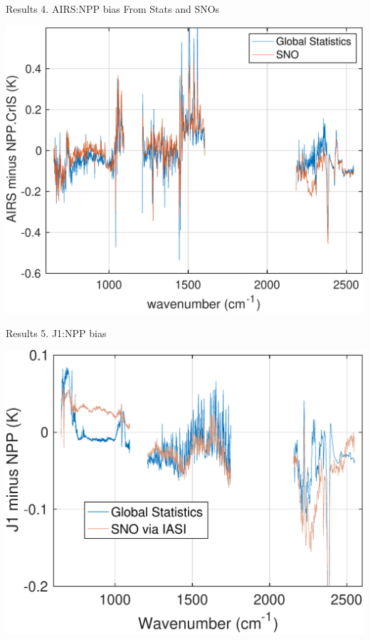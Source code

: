 \documentclass[10pt,t]{beamer}
\begin{document}
\begin{frame}{Results 4. AIRS:NPP bias From Stats and SNOs}

  \begin{center}
    \includegraphics[width=0.65\linewidth]{./Figs/2018d060_2019d059_airs_npp_ac1_bias_stats_sno_v2.pdf}
  \end{center}
    
\end{frame}

\begin{frame}{Results 5. J1:NPP bias}

\vspace{-0.1in}
  \begin{center}
    \includegraphics[width=0.7\linewidth]{./Figs/2018_jn_ic1_ic2_stats_sno_bias_v2.pdf}
  \end{center}
    
\end{frame}
\end{document}
